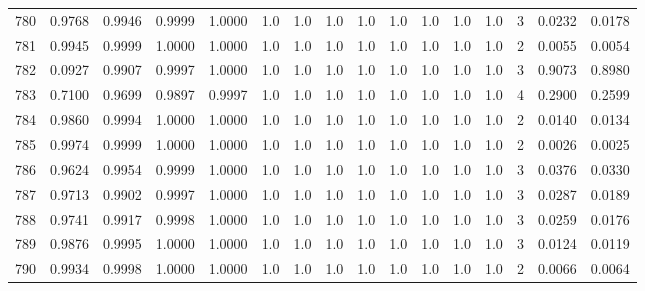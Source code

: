 \begin{tabular}{lrrrrrrrrrrrrrrr}
780 &      0.9768 &  0.9946 &  0.9999 &  1.0000 &     1.0 &     1.0 &     1.0 &     1.0 &     1.0 &     1.0 &      1.0 &        1.0 &      3 &                    0.0232 &                     0.0178 \\
781 &      0.9945 &  0.9999 &  1.0000 &  1.0000 &     1.0 &     1.0 &     1.0 &     1.0 &     1.0 &     1.0 &      1.0 &        1.0 &      2 &                    0.0055 &                     0.0054 \\
782 &      0.0927 &  0.9907 &  0.9997 &  1.0000 &     1.0 &     1.0 &     1.0 &     1.0 &     1.0 &     1.0 &      1.0 &        1.0 &      3 &                    0.9073 &                     0.8980 \\
783 &      0.7100 &  0.9699 &  0.9897 &  0.9997 &     1.0 &     1.0 &     1.0 &     1.0 &     1.0 &     1.0 &      1.0 &        1.0 &      4 &                    0.2900 &                     0.2599 \\
784 &      0.9860 &  0.9994 &  1.0000 &  1.0000 &     1.0 &     1.0 &     1.0 &     1.0 &     1.0 &     1.0 &      1.0 &        1.0 &      2 &                    0.0140 &                     0.0134 \\
785 &      0.9974 &  0.9999 &  1.0000 &  1.0000 &     1.0 &     1.0 &     1.0 &     1.0 &     1.0 &     1.0 &      1.0 &        1.0 &      2 &                    0.0026 &                     0.0025 \\
786 &      0.9624 &  0.9954 &  0.9999 &  1.0000 &     1.0 &     1.0 &     1.0 &     1.0 &     1.0 &     1.0 &      1.0 &        1.0 &      3 &                    0.0376 &                     0.0330 \\
787 &      0.9713 &  0.9902 &  0.9997 &  1.0000 &     1.0 &     1.0 &     1.0 &     1.0 &     1.0 &     1.0 &      1.0 &        1.0 &      3 &                    0.0287 &                     0.0189 \\
788 &      0.9741 &  0.9917 &  0.9998 &  1.0000 &     1.0 &     1.0 &     1.0 &     1.0 &     1.0 &     1.0 &      1.0 &        1.0 &      3 &                    0.0259 &                     0.0176 \\
789 &      0.9876 &  0.9995 &  1.0000 &  1.0000 &     1.0 &     1.0 &     1.0 &     1.0 &     1.0 &     1.0 &      1.0 &        1.0 &      3 &                    0.0124 &                     0.0119 \\
790 &      0.9934 &  0.9998 &  1.0000 &  1.0000 &     1.0 &     1.0 &     1.0 &     1.0 &     1.0 &     1.0 &      1.0 &        1.0 &      2 &                    0.0066 &                     0.0064 \\

\end{tabular}
